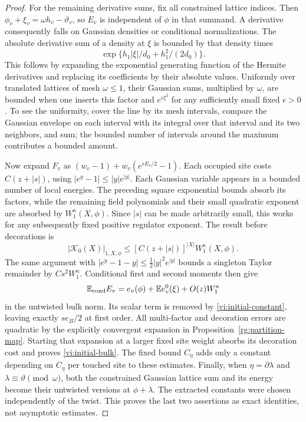 \begin{proof}
For the remaining derivative sums, fix all constrained lattice indices.
Then $\phi_v+\xi_v=\omega h_v-\vartheta_v$, so $E_v$ is independent of
$\phi$ in that summand.  A derivative consequently falls on Gaussian
densities or conditional normalizations.  The absolute derivative sum
of a density at $\xi$ is bounded by that density times
\[
 \exp\{h_1|\xi|/d_0+h_1^2/(2d_0)\}.
\]
This follows by expanding the exponential generating function of the
Hermite derivatives and replacing its coefficients by their absolute
values.  Uniformly over translated lattices of mesh $\omega\le1$, their
Gaussian sums, multiplied by $\omega$, are bounded when one inserts this
factor and $e^{\epsilon\xi^2}$ for any sufficiently small fixed
$\epsilon>0$.  To see the uniformity, cover the line by its mesh
intervals, compare the Gaussian envelope on each interval with its
integral over that interval and its two neighbors, and sum; the bounded
number of intervals around the maximum contributes a bounded amount.

Now expand $F_v$ as
$(w_v-1)+w_v(e^{sE_v/2}-1)$.  Each occupied site costs
$C(z+|s|)$, using $|e^y-1|\le |y|e^{|y|}$.  Each Gaussian variable
appears in a bounded number of local energies.  The preceding square
exponential bounds absorb its factors, while the remaining field
polynomials and their small quadratic exponent are absorbed by
$W_1^\kappa(X,\phi)$.  Since $|s|$ can be made arbitrarily small, this
works for any subsequently fixed positive regulator exponent.  The
result before decorations is
\[
 |\mathcal K_0(X)|_{1,X,\phi}
 \le [C(z+|s|)]^{|X|}W_1^\kappa(X,\phi).
\]
The same argument with
$|e^y-1-y|\le\tfrac12|y|^2e^{|y|}$ bounds a singleton Taylor remainder
by $C s^2W_1^\kappa$.  Conditional first and second moments then give
\[
 \mathbb E_{\mathrm{cond}} E_v
   =e_v(\phi)+\mathbb E e_v^0(\xi)+O(z)W_1^\kappa
\]
in the untwisted bulk norm.  Its scalar term is removed by
\eqref{vi:initial-constant}, leaving exactly $s e_B/2$ at first order.
All multi-factor and decoration errors are quadratic by the explicitly
convergent expansion in Proposition~\ref{rg:partition-map}.  Starting that
expansion at a larger fixed site weight absorbs its decoration cost and
proves \eqref{vi:initial-bulk}.  The fixed bound $C_\eta$ adds only a
constant depending on $C_\eta$ per touched site to these estimates.  Finally, when
$\eta=\partial\lambda$ and $\lambda\equiv\vartheta\pmod\omega$, both
the constrained Gaussian lattice sum and its energy become their
untwisted versions at $\phi+\lambda$.  The extracted constants were
chosen independently of the twist.  This proves the last two assertions
as exact identities, not asymptotic estimates.
\end{proof}

